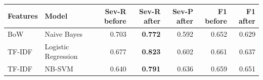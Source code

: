 \begin{tabular}{llrrrrr}
\toprule
Features & Model & Sev-R before & Sev-R after & Sev-P after & F1 before & F1 after \\
\midrule
BoW & Naive Bayes & 0.703 & \textbf{0.772} & 0.592 & 0.652 & 0.629 \\
TF-IDF & Logistic Regression & 0.677 & \textbf{0.823} & 0.602 & 0.661 & 0.637 \\
TF-IDF & NB-SVM & 0.640 & \textbf{0.791} & 0.636 & 0.659 & 0.651 \\
\bottomrule
\end{tabular}%
